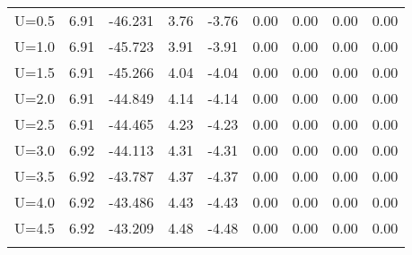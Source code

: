 \begin{table}[H]
\begin{tabular}{cccccc|ccc}
		U=0.5 & 6.91 & -46.231 & 3.76 & -3.76 & 0.00 & 0.00 & 0.00 & 0.00 \\
		U=1.0 & 6.91 & -45.723 & 3.91 & -3.91 & 0.00 & 0.00 & 0.00 & 0.00 \\
		U=1.5 & 6.91 & -45.266 & 4.04 & -4.04 & 0.00 & 0.00 & 0.00 & 0.00 \\
		U=2.0 & 6.91 & -44.849 & 4.14 & -4.14 & 0.00 & 0.00 & 0.00 & 0.00 \\
		U=2.5 & 6.91 & -44.465 & 4.23 & -4.23 & 0.00 & 0.00 & 0.00 & 0.00 \\
		U=3.0 & 6.92 & -44.113 & 4.31 & -4.31 & 0.00 & 0.00 & 0.00 & 0.00 \\
		U=3.5 & 6.92 & -43.787 & 4.37 & -4.37 & 0.00 & 0.00 & 0.00 & 0.00 \\
		U=4.0 & 6.92& -43.486 & 4.43 & -4.43 & 0.00 & 0.00 & 0.00 & 0.00 \\
		U=4.5 & 6.92 & -43.209 & 4.48 & -4.48 & 0.00 & 0.00 & 0.00 & 0.00 \\
		\bottomrule
		\bottomrule
		\label{tab:4.7}
	\end{tabular}
\end{table}





